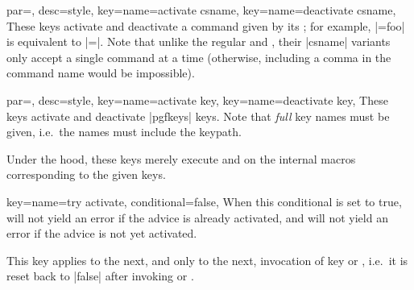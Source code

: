 \documentclass[a4paper,11pt]{article}
\begin{document}
\begin{doc}{
    par=,
    desc={style},
    key={name=activate csname},
    key={name=deactivate csname},
  }
  These keys activate and deactivate a command given by its ; for example, |=foo| is equivalent
  to |=\foo|.  Note that unlike the regular 
  and , their |csname| variants only accept a single command
  at a time (otherwise, including a comma in the command name would be
  impossible).
\end{doc}

\begin{doc}{
    par=,
    desc={style},
    key={name=activate key},
    key={name=deactivate key},
  }
  These keys activate and deactivate |pgfkeys| keys.  Note that \emph{full} key
  names must be given, i.e.\ the names must include the keypath.

  Under the hood, these keys merely execute  and
   on the internal macros corresponding to the given keys.
\end{doc}

\begin{doc}{
    key={name=try activate, conditional=false},
  }
  When this conditional is set to true,  will not yield an
  error if the advice is already activated, and  will not
  yield an error if the advice is not yet activated.

  This key applies to the next, and only to the next, invocation of key
   or , i.e.\ it is reset back to |false|
  after invoking  or .
\end{doc}
\end{document}
